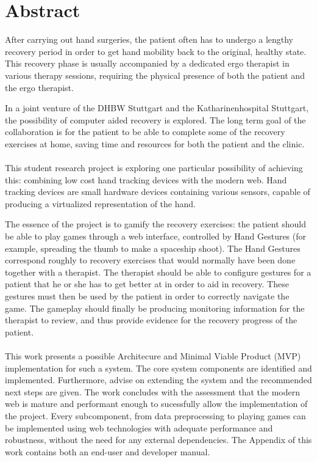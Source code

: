 \chapter{Abstract}

After carrying out hand surgeries, the patient often has to undergo a lengthy recovery period in order to get hand mobility back to the original, healthy state. This recovery phase is usually accompanied by a dedicated ergo therapist in various therapy sessions, requiring the physical presence of both the patient and the ergo therapist.

In a joint venture of the DHBW Stuttgart and the Katharinenhospital Stuttgart, the possibility of computer aided recovery is explored. The long term goal of the collaboration is for the patient to be able to complete some of the recovery exercises at home, saving time and resources for both the patient and the clinic.
\\\\
This student research project is exploring one particular possibility of achieving this: combining low cost hand tracking devices with the modern web. Hand tracking devices are small hardware devices containing various sensors, capable of producing a virtualized representation of the hand. 


The essence of the project is to gamify the recovery exercises: the patient should be able to play games through a web interface, controlled by Hand Gestures (for example, spreading the thumb to make a spaceship shoot). The Hand Gestures correspond roughly to recovery exercises that would normally have been done together with a therapist. The therapist should be able to configure gestures for a patient that he or she has to get better at in order to aid in recovery. These gestures must then be used by the patient in order to correctly navigate the game. The gameplay should finally be producing monitoring information for the therapist to review, and thus provide evidence for the recovery progress of the patient.
\\\\
This work presents a possible Architecure and Minimal Viable Product (MVP) implementation for such a system. The core system components are identified and implemented. Furthermore, advise on extending the system and the recommended next steps are given. The work concludes with the assessment that the modern web is mature and performant enough to sucessfully allow the implementation of the project. Every subcomponent, from data preprocessing to playing games can be implemented using web technologies with adequate performance and robustness, without the need for any external dependencies. The Appendix of this work contains both an end-user and developer manual. 
